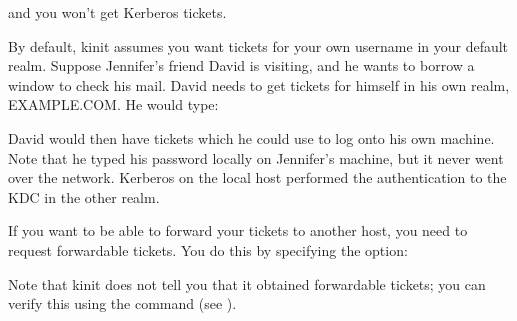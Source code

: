 \documentclass[letterpaper,10pt,english]{sphinxmanual}
\begin{document}
\sphinxAtStartPar
and you won’t get Kerberos tickets.

\sphinxAtStartPar
By default, kinit assumes you want tickets for your own username in
your default realm.  Suppose Jennifer’s friend David is visiting, and
he wants to borrow a window to check his mail.  David needs to get
tickets for himself in his own realm, EXAMPLE.COM.  He would type:

\begin{sphinxVerbatim}[commandchars=\\\{\}]
  
    \PYG{p}{[} \PYG{l+s+s1}{s password here.]}
\end{sphinxVerbatim}

\sphinxAtStartPar
David would then have tickets which he could use to log onto his own
machine.  Note that he typed his password locally on Jennifer’s
machine, but it never went over the network.  Kerberos on the local
host performed the authentication to the KDC in the other realm.

\sphinxAtStartPar
If you want to be able to forward your tickets to another host, you
need to request forwardable tickets.  You do this by specifying the
 option:

\begin{sphinxVerbatim}[commandchars=\\\{\}]
  
    \PYG{p}{[}   \PYG{p}{]}
\end{sphinxVerbatim}

\sphinxAtStartPar
Note that kinit does not tell you that it obtained forwardable
tickets; you can verify this using the {\hyperref[\detokenize{user/user_commands/klist:klist-1}]{}} command (see
{\hyperref[\detokenize{user/tkt_mgmt:view-tkt}]{}}).
\end{document}
